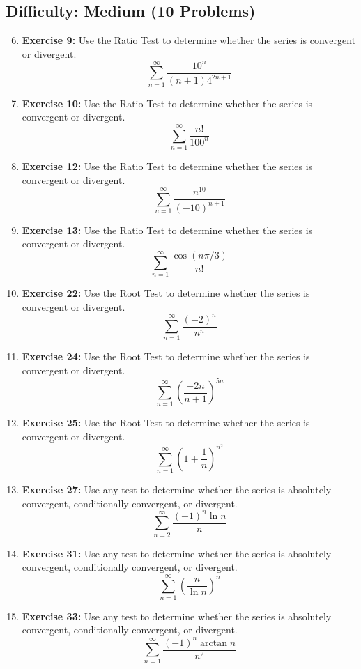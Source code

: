 \documentclass{article}
\begin{document}
\subsection*{Difficulty: Medium (10 Problems)}
\begin{enumerate}
    \setcounter{enumi}{5} %
    \item \textbf{Exercise 9:} Use the Ratio Test to determine whether the series is convergent or divergent.
    \[ \sum_{n=1}^{\infty} \frac{10^n}{(n+1) 4^{2n+1}} \]
    
    \item \textbf{Exercise 10:} Use the Ratio Test to determine whether the series is convergent or divergent.
    \[ \sum_{n=1}^{\infty} \frac{n!}{100^n} \]
    
    \item \textbf{Exercise 12:} Use the Ratio Test to determine whether the series is convergent or divergent.
    \[ \sum_{n=1}^{\infty} \frac{n^{10}}{(-10)^{n+1}} \]
    
    \item \textbf{Exercise 13:} Use the Ratio Test to determine whether the series is convergent or divergent.
    \[ \sum_{n=1}^{\infty} \frac{\cos(n\pi/3)}{n!} \]
    
    \item \textbf{Exercise 22:} Use the Root Test to determine whether the series is convergent or divergent.
    \[ \sum_{n=1}^{\infty} \frac{(-2)^n}{n^n} \]
    
    \item \textbf{Exercise 24:} Use the Root Test to determine whether the series is convergent or divergent.
    \[ \sum_{n=1}^{\infty} \left(\frac{-2n}{n+1}\right)^{5n} \]
    
    \item \textbf{Exercise 25:} Use the Root Test to determine whether the series is convergent or divergent.
    \[ \sum_{n=1}^{\infty} \left(1 + \frac{1}{n}\right)^{n^2} \]
    
    \item \textbf{Exercise 27:} Use any test to determine whether the series is absolutely convergent, conditionally convergent, or divergent.
    \[ \sum_{n=2}^{\infty} \frac{(-1)^n \ln n}{n} \]
    
    \item \textbf{Exercise 31:} Use any test to determine whether the series is absolutely convergent, conditionally convergent, or divergent.
    \[ \sum_{n=1}^{\infty} (\frac{n}{\ln{n}})^n \]
    
    \item \textbf{Exercise 33:} Use any test to determine whether the series is absolutely convergent, conditionally convergent, or divergent.
    \[ \sum_{n=1}^{\infty} \frac{(-1)^n \arctan n}{n^2} \]
\end{enumerate}
\end{document}
